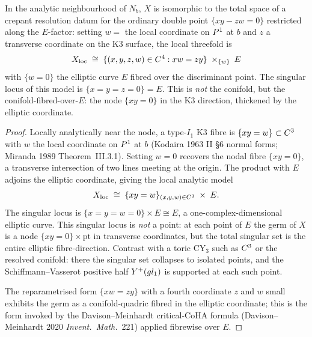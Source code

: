\begin{proposition}
\label{gluing:prop:local-model-curve-stalk}
In the analytic neighbourhood of $N_b$, $X$ is isomorphic to the total
space of a crepant resolution datum for the ordinary double point
$\{xy - zw = 0\}$ restricted along the $E$-factor: setting $w = $ the
local coordinate on $P^1$ at $b$ and $z$ a transverse coordinate on
the K3 surface, the local threefold is
\[
 X_{\text{loc}} \;\cong\;
 \{(x, y, z, w) \in C^4 : xw = zy\} \;\times_{\{w\}}\; E
\]
with $\{w = 0\}$ the elliptic curve $E$ fibred over the discriminant
point. The singular locus of this model is $\{x = y = z = 0\} = E$.
This is \emph{not} the conifold, but the conifold-fibred-over-$E$:
the node $\{xy = 0\}$ in the K3 direction, thickened by the elliptic
coordinate.
\end{proposition}

\begin{proof}
Locally analytically near the node, a type-$I_1$ K3 fibre is
$\{xy = w\} \subset C^3$ with $w$ the local coordinate on $P^1$
at $b$ (Kodaira 1963 II \S 6 normal forms; Miranda 1989 Theorem~III.3.1).
Setting $w = 0$ recovers the nodal fibre $\{xy = 0\}$, a transverse
intersection of two lines meeting at the origin. The product with
$E$ adjoins the elliptic coordinate, giving the local analytic model
\[
 X_{\text{loc}} \;\cong\; \{xy = w\}_{(x, y, w) \in C^3}
 \;\times\; E.
\]
The singular locus is $\{x = y = w = 0\} \times E \cong E$, a
one-complex-dimensional elliptic curve. This singular locus is
\emph{not} a point: at each point of $E$ the germ of $X$ is a
node $\{xy = 0\} \times \mathrm{pt}$ in transverse coordinates,
but the total singular set is the entire elliptic fibre-direction.
Contrast with a toric CY$_3$ such as $C^3$ or the resolved
conifold: there the singular set collapses to isolated points, and
the Schiffmann--Vasserot positive half $Y^{+}(gl_1)$
is supported at each such point.

The reparametrised form $\{xw = zy\}$ with a fourth coordinate $z$
and $w$ small exhibits the germ as a conifold-quadric fibred in the
elliptic coordinate; this is the form invoked by the
Davison--Meinhardt critical-CoHA formula
(Davison--Meinhardt 2020 \emph{Invent.\ Math.}~221) applied
fibrewise over $E$.
\end{proof}

